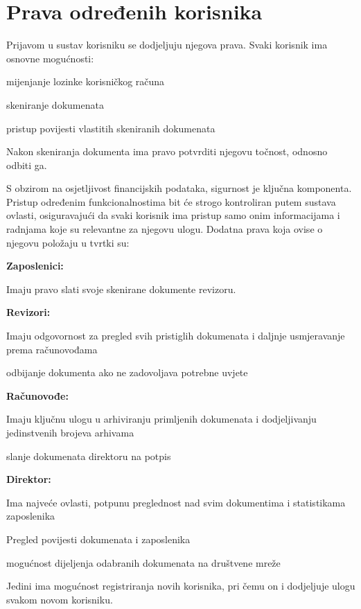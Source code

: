 		\section{Prava određenih korisnika}
		
		Prijavom u sustav korisniku se dodjeljuju njegova prava. Svaki korisnik ima osnovne mogućnosti:
		\begin{packed_item}
			\item mijenjanje lozinke korisničkog računa
			\item skeniranje dokumenata
			\item pristup povijesti vlastitih skeniranih dokumenata
			\item Nakon skeniranja dokumenta ima pravo potvrditi njegovu točnost, odnosno odbiti ga.
		\end{packed_item}
		S obzirom na osjetljivost financijskih podataka, sigurnost je ključna komponenta. Pristup određenim funkcionalnostima bit će strogo kontroliran putem sustava ovlasti,
		 osiguravajući da svaki korisnik ima pristup samo onim informacijama i radnjama koje su relevantne za njegovu ulogu.
		\newline
		Dodatna prava koja ovise o njegovu položaju u tvrtki su:
		\begin{packed_item}
			\item \textbf{Zaposlenici:} 
					\begin{packed_item}
						\item Imaju pravo slati svoje skenirane dokumente revizoru.
					\end{packed_item}
			\item \textbf{Revizori:} 
					\begin{packed_item}
						\item Imaju odgovornost za pregled svih pristiglih dokumenata i daljnje usmjeravanje prema računovođama
						\item odbijanje dokumenta ako ne zadovoljava potrebne uvjete 
					\end{packed_item}
			\item \textbf{Računovođe:} 
						\begin{packed_item}
						\item Imaju ključnu ulogu u arhiviranju primljenih dokumenata i dodjeljivanju jedinstvenih brojeva arhivama
						\item slanje dokumenata direktoru na potpis
					\end{packed_item}
			\item \textbf{Direktor:}
						\begin{packed_item} 
							\item Ima najveće ovlasti, potpunu preglednost nad svim dokumentima i statistikama zaposlenika
							\item Pregled povijesti dokumenata i zaposlenika
							\item mogućnost dijeljenja odabranih dokumenata na društvene mreže
							\item Jedini ima mogućnost registriranja novih korisnika, pri čemu on i dodjeljuje ulogu svakom novom korisniku. 
						\end{packed_item}
		\end{packed_item}
		
